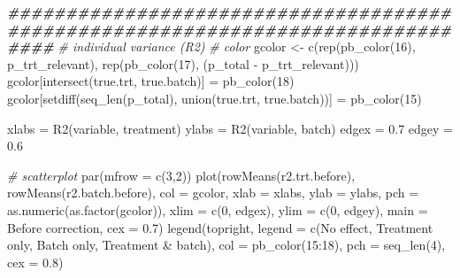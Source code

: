 \documentclass[
]{book}
\newenvironment{Shaded}{\begin{snugshade}}{\end{snugshade}}
\newcommand{\AttributeTok}[1]{\textcolor[rgb]{0.77,0.63,0.00}{#1}}
\newcommand{\CommentTok}[1]{\textcolor[rgb]{0.56,0.35,0.01}{\textit{#1}}}
\newcommand{\DecValTok}[1]{\textcolor[rgb]{0.00,0.00,0.81}{#1}}
\newcommand{\DocumentationTok}[1]{\textcolor[rgb]{0.56,0.35,0.01}{\textbf{\textit{#1}}}}
\newcommand{\FloatTok}[1]{\textcolor[rgb]{0.00,0.00,0.81}{#1}}
\newcommand{\FunctionTok}[1]{\textcolor[rgb]{0.00,0.00,0.00}{#1}}
\newcommand{\NormalTok}[1]{#1}
\newcommand{\OtherTok}[1]{\textcolor[rgb]{0.56,0.35,0.01}{#1}}
\newcommand{\SpecialCharTok}[1]{\textcolor[rgb]{0.00,0.00,0.00}{#1}}
\newcommand{\StringTok}[1]{\textcolor[rgb]{0.31,0.60,0.02}{#1}}
\begin{document}
\begin{Shaded}
\begin{Highlighting}[]
\DocumentationTok{\#\#\#\#\#\#\#\#\#\#\#\#\#\#\#\#\#\#\#\#\#\#\#\#\#\#\#\#\#\#\#\#\#\#\#\#\#\#\#\#\#\#\#\#\#\#\#\#\#\#\#\#\#\#\#\#\#\#\#\#\#\#\#\#\#\#\#\#\#\#\#\#\#\#\#\#\#\#\#\#}
\CommentTok{\# individual variance (R2)}
\CommentTok{\# color}
\NormalTok{gcolor }\OtherTok{\textless{}{-}} \FunctionTok{c}\NormalTok{(}\FunctionTok{rep}\NormalTok{(}\FunctionTok{pb\_color}\NormalTok{(}\DecValTok{16}\NormalTok{), p\_trt\_relevant), }
            \FunctionTok{rep}\NormalTok{(}\FunctionTok{pb\_color}\NormalTok{(}\DecValTok{17}\NormalTok{), (p\_total }\SpecialCharTok{{-}}\NormalTok{ p\_trt\_relevant)))}
\NormalTok{gcolor[}\FunctionTok{intersect}\NormalTok{(true.trt, true.batch)] }\OtherTok{=} \FunctionTok{pb\_color}\NormalTok{(}\DecValTok{18}\NormalTok{)}
\NormalTok{gcolor[}\FunctionTok{setdiff}\NormalTok{(}\FunctionTok{seq\_len}\NormalTok{(p\_total), }\FunctionTok{union}\NormalTok{(true.trt, true.batch))] }\OtherTok{=} \FunctionTok{pb\_color}\NormalTok{(}\DecValTok{15}\NormalTok{)}

\NormalTok{xlabs }\OtherTok{=} \StringTok{\textquotesingle{}R2(variable, treatment)\textquotesingle{}}
\NormalTok{ylabs }\OtherTok{=} \StringTok{\textquotesingle{}R2(variable, batch)\textquotesingle{}}
\NormalTok{edgex }\OtherTok{=} \FloatTok{0.7}
\NormalTok{edgey }\OtherTok{=} \FloatTok{0.6}

\CommentTok{\# scatterplot}
\FunctionTok{par}\NormalTok{(}\AttributeTok{mfrow =} \FunctionTok{c}\NormalTok{(}\DecValTok{3}\NormalTok{,}\DecValTok{2}\NormalTok{))}
\FunctionTok{plot}\NormalTok{(}\FunctionTok{rowMeans}\NormalTok{(r2.trt.before), }\FunctionTok{rowMeans}\NormalTok{(r2.batch.before), }\AttributeTok{col =}\NormalTok{ gcolor, }
     \AttributeTok{xlab =}\NormalTok{ xlabs, }\AttributeTok{ylab =}\NormalTok{ ylabs, }\AttributeTok{pch =} \FunctionTok{as.numeric}\NormalTok{(}\FunctionTok{as.factor}\NormalTok{(gcolor)),}
     \AttributeTok{xlim =} \FunctionTok{c}\NormalTok{(}\DecValTok{0}\NormalTok{, edgex), }\AttributeTok{ylim =} \FunctionTok{c}\NormalTok{(}\DecValTok{0}\NormalTok{, edgey), }
     \AttributeTok{main =} \StringTok{\textquotesingle{}Before correction\textquotesingle{}}\NormalTok{, }\AttributeTok{cex =} \FloatTok{0.7}\NormalTok{)}
\FunctionTok{legend}\NormalTok{(}\StringTok{\textquotesingle{}topright\textquotesingle{}}\NormalTok{, }\AttributeTok{legend =} \FunctionTok{c}\NormalTok{(}\StringTok{\textquotesingle{}No effect\textquotesingle{}}\NormalTok{, }\StringTok{\textquotesingle{}Treatment only\textquotesingle{}}\NormalTok{, }
                              \StringTok{\textquotesingle{}Batch only\textquotesingle{}}\NormalTok{, }\StringTok{\textquotesingle{}Treatment \& batch\textquotesingle{}}\NormalTok{), }
       \AttributeTok{col =} \FunctionTok{pb\_color}\NormalTok{(}\DecValTok{15}\SpecialCharTok{:}\DecValTok{18}\NormalTok{), }\AttributeTok{pch =} \FunctionTok{seq\_len}\NormalTok{(}\DecValTok{4}\NormalTok{), }\AttributeTok{cex =} \FloatTok{0.8}\NormalTok{)}


\end{Highlighting}
\end{Shaded}
\end{document}
